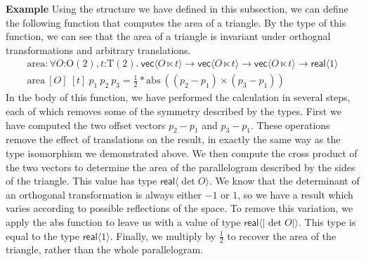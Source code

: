 \documentclass{article}
\newcommand{\Orth}{\mathrm{O}}
\newcommand{\Transl}{\mathrm{T}}
\newenvironment{example}{\vspace{0.1in}\noindent\textbf{Example}\quad}{}
\begin{document}
\begin{example}
  Using the structure we have defined in this subsection, we can
  define the following function that computes the area of a
  triangle. By the type of this function, we can see that the area of
  a triangle is invariant under orthognal transformations and
  arbitrary translations.
  \begin{displaymath}
    \begin{array}{l}
      \mathrm{area} : \forall O\mathord:\Orth(2), t\mathord:\Transl(2).\ \mathsf{vec}\langle O \ltimes t \rangle \to \mathsf{vec}\langle O \ltimes t \rangle \to \mathsf{vec}\langle O \ltimes t \rangle \to \mathsf{real}\langle 1 \rangle \\
      \mathrm{area}\ [O]\ [t]\ p_1\ p_2\ p_3 = \frac{1}{2} * \mathrm{abs}\ ((p_2 - p_1) \times (p_3 - p_1))
    \end{array}
  \end{displaymath}
  In the body of this function, we have performed the calculation in
  several steps, each of which removes some of the symmetry described
  by the types. First we have computed the two offset vectors $p_2 -
  p_1$ and $p_3 - p_1$. These operations remove the effect of
  translations on the result, in exactly the same way as the type
  isomorphism we demonstrated above. We then compute the cross product
  of the two vectors to determine the area of the parallelogram
  described by the sides of the triangle. This value has type
  $\mathsf{real}\langle \det O \rangle$. We know that the determinant
  of an orthogonal transformation is always either $-1$ or $1$, so we
  have a result which varies according to possible reflections of the
  space. To remove this variation, we apply the $\mathrm{abs}$
  function to leave us with a value of type $\mathsf{real}\langle
  |\det O| \rangle$. This type is equal to the type
  $\mathsf{real}\langle 1 \rangle$. Finally, we multiply by
  $\frac{1}{2}$ to recover the area of the triangle, rather than the
  whole parallelogram.
\end{example}


\end{document}

